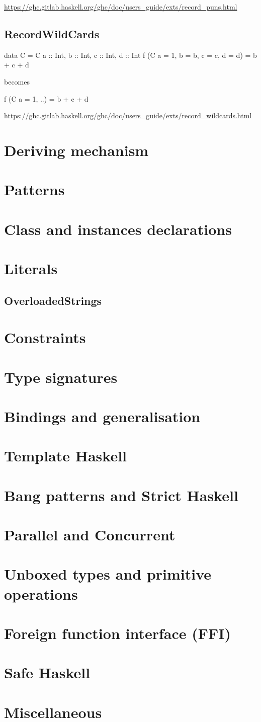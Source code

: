 \documentclass[openany, 11pt]{book}
\begin{document}
\url{https://ghc.gitlab.haskell.org/ghc/doc/users_guide/exts/record_puns.html}

\chapter{RecordWildCards}
\begin{haskell}{}
data C = C {a :: Int, b :: Int, c :: Int, d :: Int}
f (C {a = 1, b = b, c = c, d = d}) = b + c + d
\end{haskell}
becomes

\begin{haskell}{}
f (C {a = 1, ..}) = b + c + d
\end{haskell}
\url{https://ghc.gitlab.haskell.org/ghc/doc/users_guide/exts/record_wildcards.html}


\part{Deriving mechanism}
\part{Patterns}
\part{Class and instances declarations}
\part{Literals}
\chapter{OverloadedStrings}

\part{Constraints}
\part{Type signatures}
\part{Bindings and generalisation}
\part{Template Haskell}
\part{Bang patterns and Strict Haskell}
\part{Parallel and Concurrent}
\part{Unboxed types and primitive operations}
\part{Foreign function interface (FFI)}
\part{Safe Haskell}
\part{Miscellaneous}
\end{document}
